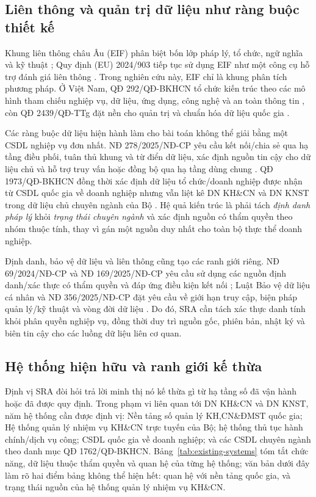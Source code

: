 \subsection{Liên thông và quản trị dữ liệu như ràng buộc thiết kế}
\label{subsec:vietnam-frameworks}

Khung liên thông châu Âu (EIF) phân biệt bốn lớp pháp lý, tổ chức, ngữ nghĩa và kỹ thuật \citep[Hình~3, p.~22; pp.~27--30]{eif2017}; Quy định (EU) 2024/903 tiếp tục sử dụng EIF như một công cụ hỗ trợ đánh giá liên thông \citep{euact2024}. Trong nghiên cứu này, EIF chỉ là khung phân tích phương pháp. Ở Việt Nam, QĐ 292/QĐ-BKHCN tổ chức kiến trúc theo các mô hình tham chiếu nghiệp vụ, dữ liệu, ứng dụng, công nghệ và an toàn thông tin \citep{qd292_2025}, còn QĐ 2439/QĐ-TTg đặt nền cho quản trị và chuẩn hóa dữ liệu quốc gia \citep{qd2439_2025}.

Các ràng buộc dữ liệu hiện hành làm cho bài toán không thể giải bằng một CSDL nghiệp vụ đơn nhất. NĐ 278/2025/NĐ-CP yêu cầu kết nối/chia sẻ qua hạ tầng điều phối, tuân thủ khung và từ điển dữ liệu, xác định nguồn tin cậy cho dữ liệu chủ và hỗ trợ truy vấn hoặc đồng bộ qua hạ tầng dùng chung \citep{nd278_2025}. QĐ 1973/QĐ-BKHCN đồng thời xác định dữ liệu tổ chức/doanh nghiệp được nhận từ CSDL quốc gia về doanh nghiệp nhưng vẫn liệt kê DN KH\&CN và DN KNST trong dữ liệu chủ chuyên ngành của Bộ \citep{qd1973_2026}. Hệ quả kiến trúc là phải tách \emph{định danh pháp lý} khỏi \emph{trạng thái chuyên ngành} và xác định nguồn có thẩm quyền theo nhóm thuộc tính, thay vì gán một nguồn duy nhất cho toàn bộ thực thể doanh nghiệp.

Định danh, bảo vệ dữ liệu và liên thông cũng tạo các ranh giới riêng. NĐ 69/2024/NĐ-CP và NĐ 169/2025/NĐ-CP yêu cầu sử dụng các nguồn định danh/xác thực có thẩm quyền và đáp ứng điều kiện kết nối \citep{nd69_2024,nd169_2025}; Luật Bảo vệ dữ liệu cá nhân và NĐ 356/2025/NĐ-CP đặt yêu cầu về giới hạn truy cập, biện pháp quản lý/kỹ thuật và vòng đời dữ liệu \citep{luatbvdlcn2025,nd356_2025}. Do đó, SRA cần tách xác thực danh tính khỏi phân quyền nghiệp vụ, đồng thời duy trì nguồn gốc, phiên bản, nhật ký và biên tin cậy cho các luồng dữ liệu liên cơ quan.

\subsection{Hệ thống hiện hữu và ranh giới kế thừa}
\label{subsec:existing-systems}

Định vị SRA đòi hỏi trả lời minh thị nó kế thừa gì từ hạ tầng số đã vận hành hoặc đã được quy định. Trong phạm vi liên quan tới DN KH\&CN và DN KNST, năm hệ thống cần được định vị: Nền tảng số quản lý KH,CN\&ĐMST quốc gia; Hệ thống quản lý nhiệm vụ KH\&CN trực tuyến của Bộ; hệ thống thủ tục hành chính/dịch vụ công; CSDL quốc gia về doanh nghiệp; và các CSDL chuyên ngành theo danh mục QĐ 1762/QĐ-BKHCN. Bảng~\ref{tab:existing-systems} tóm tắt chức năng, dữ liệu thuộc thẩm quyền và quan hệ của từng hệ thống; văn bản dưới đây làm rõ hai điểm bảng không thể hiện hết: quan hệ với nền tảng quốc gia, và trạng thái nguồn của hệ thống quản lý nhiệm vụ KH\&CN.

